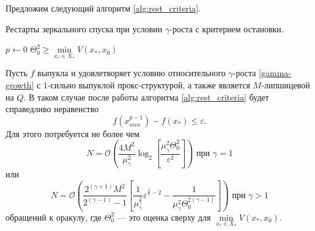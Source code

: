      Предложим следующий алгоритм \ref{alg:rest_criteria}. 
     \begin{algorithm}[htp]
        \caption{Рестарты зеркального спуска при условии $\gamma$-роста с критерием остановки.}
        \label{alg:rest_criteria}
        $p \gets 0$\;
        $\Theta_0^2 \geq \min\limits_{x_* \in X_*}{V(x_*,x_0)}$\;
    \end{algorithm}
    \begin{theorem}
        Пусть $f$ выпукла и удовлетворяет условию относительного $\gamma$-роста \eqref{gamma-growth} с 1-сильно выпуклой прокс-структурой, а также является $M$-липшицевой на $Q$. В таком случае после работы алгоритма \ref{alg:rest_criteria} будет справедливо неравенство
        \begin{equation}
            f(x_{min}^{p-1}) - f(x_*) \leq \varepsilon.
        \end{equation}
        Для этого потребуется не более чем
        \begin{equation}
           N = \mathcal{O} \left( \frac{4 M^2}{\mu_{\gamma}^2} \log_2{\left[\frac{\mu_{\gamma}^2 \Theta_0^2}{\varepsilon^2} \right]} \right) \text{ при } \gamma = 1
        \end{equation}
        или
        \begin{equation}
           N = \mathcal{O}\left( \frac{2^{(\gamma + 1)} M^2 }{2^{(\gamma - 1)} - 1}\left[ \frac{1}{\mu_{\gamma}^{\frac{2}{\gamma}}} \varepsilon^{\frac{2}{\gamma} - 2} - \frac{1}{\mu_{\gamma}^2 \Theta_0^{2(\gamma - 1)}} \right] \right) \text{ при } \gamma > 1
        \end{equation}
        обращений к оракулу, где $\Theta_0^2$ --- это оценка сверху для $\min\limits_{x_* \in X_*}{V(x_*, x_0)}$.
    \end{theorem}

